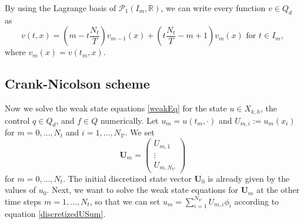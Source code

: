 By using the Lagrange basis of $\mathcal{P}_1(I_m,\mathbb{R})$, we can write every function $v \in Q_d$ as
\begin{equation}
\label{discretizeVariableInTime}
v(t,x)=\left(m-t\frac{N_t}{T}\right) v_{m-1}(x)+\left(t\frac{N_t}{T}-m+1\right) v_m(x)\text{ for }t\in I_m,
\end{equation}
where $v_m(x)=v(t_m,x)$.


\subsection{Crank-Nicolson scheme}
Now we solve the weak state equations \eqref{weakEq} for the state $u\in X_{k,h}$, the control $q\in Q_d$, and $f\in Q$ numerically. Let $u_m=u(t_m, \cdot)$ and $U_{m,i}:=u_m(x_i)$ for $m=0,\dotsc,N_t$ and $i=1,\dotsc,N_\mathcal{V}$. We set
\begin{displaymath}
\mathbf{U}_m=\begin{pmatrix} U_{m,1} \\ \vdots \\ U_{m,N_\mathcal{V}} \end{pmatrix}
\end{displaymath}
for $m=0,\dotsc,N_t$. The initial discretized state vector $\mathbf{U}_0$ is already given by the values of $u_0$. Next, we want to solve the weak state equations for $\mathbf{U}_m$ at the other time steps $m=1,\dotsc,N_t$, so that we can set $u_m=\sum_{i=1}^{N_\mathcal{V}}U_{m,i}\phi_i$ according to equation \eqref{discretizedUSum}.


